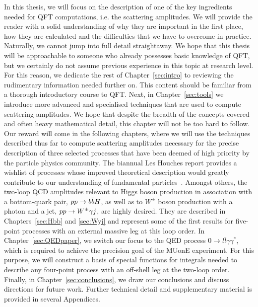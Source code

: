 \documentclass[main.tex]{subfiles}
\begin{document}
In this thesis, we will focus on the description of one of the key ingredients needed for QFT computations, i.e. the scattering amplitudes. We will provide the reader with a solid understanding of why they are important in the first place, how they are calculated and the difficulties that we have to overcome in practice. Naturally, we cannot jump into full detail straightaway. We hope that this thesis will be approachable to someone who already possesses basic knowledge of QFT, but we certainly do not assume previous experience in this topic at research level. For this reason, we dedicate the rest of Chapter~\ref{sec:intro} to reviewing the rudimentary information needed further on. This content should be familiar from a thorough introductory course to QFT. Next, in Chapter~\ref{sec:tools} we introduce more advanced and specialised techniques that are used to compute scattering amplitudes. We hope that despite the breadth of the concepts covered and often heavy mathematical detail, this chapter will not be too hard to follow. Our reward will come in the following chapters, where we will use the techniques described thus far to compute scattering amplitudes necessary for the precise description of three selected processes that have been deemed of high priority by the particle physics community. The biannual Les Houches report provides a wishlist of processes whose improved theoretical description would greatly contribute to our understanding of fundamental particles~\cite{Huss:2022ful}. Amongst others, the two-loop QCD amplitudes relevant to Higgs boson production in association with a bottom-quark pair, $pp \rightarrow b\bar{b}H$, as well as to $W^\pm$ boson production with a photon and a jet, $pp \rightarrow W^\pm \gamma j$, are highly desired. They are described in Chapters~\ref{sec:Hbb} and \ref{sec:Wyj} and represent some of the first results for five-point processes with an external massive leg at this loop order. In Chapter~\ref{sec:QEDpaper}, we switch our focus to the QED process $0 \to l \bar{l} \gamma \gamma^\ast$, which is required to achieve the precision goal of the MUonE experiment. For this purpose, we will construct a basis of special functions for integrals needed to describe any four-point process with an off-shell leg at the two-loop order. Finally, in Chapter~\ref{sec:conclusions}, we draw our conclusions and discuss directions for future work. Further technical detail and supplementary material is provided in several Appendices.
\end{document}
